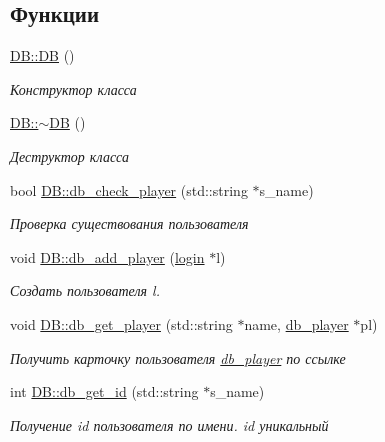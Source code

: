 \subsection*{Функции}
\begin{DoxyCompactItemize}
\item 
\mbox{\hyperlink{group__dbcpp_ga29a603c52c10831cddee82518417f992}{D\+B\+::\+DB}} ()
\begin{DoxyCompactList}\small\item\em Конструктор класса \end{DoxyCompactList}\item 
\mbox{\hyperlink{group__dbcpp_ga7bd1418f67b11d0f752537123e7e6d28}{D\+B\+::$\sim$\+DB}} ()
\begin{DoxyCompactList}\small\item\em Деструктор класса \end{DoxyCompactList}\item 
bool \mbox{\hyperlink{group__dbcpp_gaea6044c3fffc4c31714c732bb3789f71}{D\+B\+::db\+\_\+check\+\_\+player}} (std\+::string $\ast$s\+\_\+name)
\begin{DoxyCompactList}\small\item\em Проверка существования пользователя \end{DoxyCompactList}\item 
void \mbox{\hyperlink{group__dbcpp_ga472c425f9a22c467e4acd0e800153837}{D\+B\+::db\+\_\+add\+\_\+player}} (\mbox{\hyperlink{structlogin}{login}} $\ast$l)
\begin{DoxyCompactList}\small\item\em Создать пользователя l. \end{DoxyCompactList}\item 
void \mbox{\hyperlink{group__dbcpp_ga1e5d244a838c99a8753727cf0abd1f70}{D\+B\+::db\+\_\+get\+\_\+player}} (std\+::string $\ast$name, \mbox{\hyperlink{structdb__player}{db\+\_\+player}} $\ast$pl)
\begin{DoxyCompactList}\small\item\em Получить карточку пользователя \mbox{\hyperlink{structdb__player}{db\+\_\+player}} по ссылке \end{DoxyCompactList}\item 
int \mbox{\hyperlink{group__dbcpp_gaa8cdb5ec4f2f269d13cff52b9e47c4cb}{D\+B\+::db\+\_\+get\+\_\+id}} (std\+::string $\ast$s\+\_\+name)
\begin{DoxyCompactList}\small\item\em Получение id пользователя по имени. id уникальный \end{DoxyCompactList}\item 

\end{DoxyCompactItemize}
